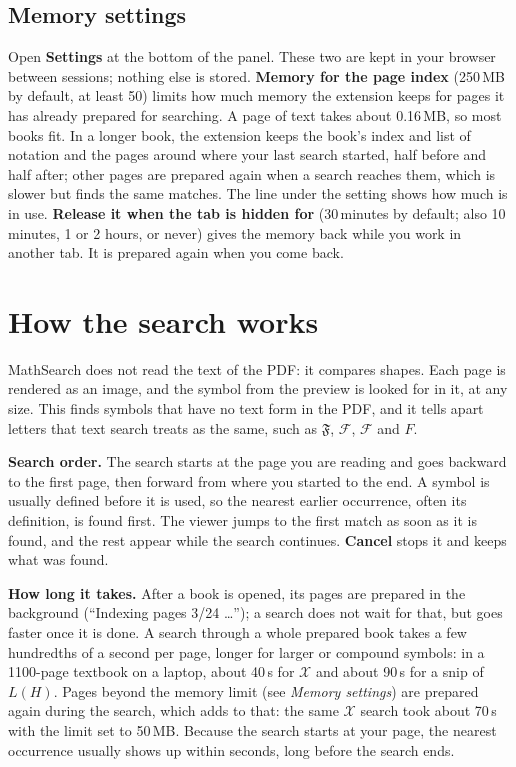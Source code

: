 \documentclass[11pt]{article}
\begin{document}
\subsection*{Memory settings}
Open \textbf{Settings} at the bottom of the panel. These two are kept in your
browser between sessions; nothing else is stored.
\textbf{Memory for the page index} (250\,MB by default, at least 50) limits
how much memory the extension keeps for pages it has already prepared for
searching. A page of text takes about 0.16\,MB, so most books fit. In a
longer book, the extension keeps the book's index and list of notation and
the pages around where your last search started, half before and half
after; other pages are prepared again when a search reaches them, which is
slower but finds the same matches. The line under the setting shows how much
is in use.
\textbf{Release it when the tab is hidden for} (30\,minutes by default;
also 10\,minutes, 1 or 2 hours, or never) gives the memory back while you
work in another tab. It is prepared again when you come back.

\section{How the search works}\label{sec:search}

MathSearch does not read the text of the PDF: it compares shapes. Each page
is rendered as an image, and the symbol from the preview is looked for in
it, at any size. This finds symbols that have no text form in the PDF, and
it tells apart letters that text search treats as the same, such as
$\mathfrak{F}$, $\mathscr{F}$, $\mathcal{F}$ and $F$.

\medskip\noindent\textbf{Search order.} The search starts at the page you are
reading and goes backward to the first page, then forward from where you
started to the end. A symbol is usually defined before it is used, so the
nearest earlier occurrence, often its definition, is found first. The viewer
jumps to the first match as soon as it is found, and the rest appear while
the search continues. \textbf{Cancel} stops it and keeps what was found.

\medskip\noindent\textbf{How long it takes.} After a book is opened, its pages
are prepared in the background (``Indexing pages 3/24 \dots''); a search
does not wait for that, but goes faster once it is done. A search through a
whole prepared book takes a few hundredths of a second per page, longer for
larger or compound symbols: in a 1100-page textbook on a laptop, about 40\,s
for $\mathscr{X}$ and about 90\,s for a snip of $L(H)$. Pages beyond the
memory limit (see \emph{Memory settings}) are prepared again during the
search, which adds to that: the same $\mathscr{X}$ search took about 70\,s
with the limit set to 50\,MB. Because the search starts at your page, the
nearest occurrence usually shows up within seconds, long before the search
ends.
\end{document}
